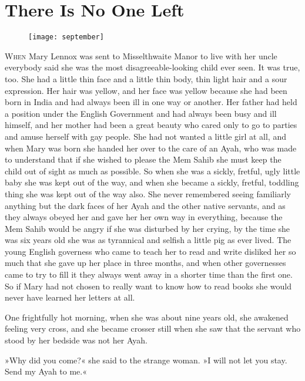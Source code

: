 \chapter{There Is No One Left}
	
\begin{figure}[t!]
\centering
\texttt{[image: september]}
\end{figure}

 \lettrine[lines=6]{W}{hen} Mary Lennox was sent to Misselthwaite Manor to live with her uncle everybody said she was the most dis\-agree\-able-looking child ever seen. It was true, too. She had a little thin face and a little thin body, thin light hair and a sour expression. Her hair was yellow, and her face was yellow because she had been born in India and had always been ill in one way or another. Her father had held a position under the English Government and had always been busy and ill himself, and her mother had been a great beauty who cared only to go to parties and amuse herself with gay people. She had not wanted a little girl at all, and when Mary was born she handed her over to the care of an Ayah, who was made to understand that if she wished to please the Mem Sahib she must keep the child out of sight as much as possible. So when she was a sickly, fretful, ugly little baby she was kept out of the way, and when she became a sickly, fretful, toddling thing she was kept out of the way also. She never remembered seeing familiarly anything but the dark faces of her Ayah and the other native servants, and as they always obeyed her and gave her her own way in everything, because the Mem Sahib would be angry if she was disturbed by her crying, by the time she was six years old she was as tyrannical and selfish a little pig as ever lived. The young English governess who came to teach her to read and write disliked her so much that she gave up her place in three months, and when other governesses came to try to fill it they always went away in a shorter time than the first one. So if Mary had not chosen to really want to know how to read books she would never have learned her letters at all.

One frightfully hot morning, when she was about nine years old, she awakened feeling very cross, and she became crosser still when she saw that the servant who stood by her bedside was not her Ayah.

»Why did you come?« she said to the strange woman. »I will not let you stay. Send my Ayah to me.«

